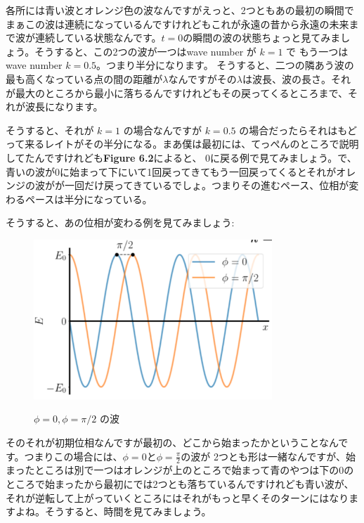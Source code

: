 各所には青い波とオレンジ色の波なんですがえっと、2つともあの最初の瞬間でまぁこの波は連続になっているんですけれどもこれが永遠の昔から永遠の未来まで波が連続している状態なんです。$t=0$の瞬間の波の状態ちょっと見てみましょう。そうすると、この2つの波が一つはwave number が $k = 1$ で
もう一つは wave number $k = 0.5$。つまり半分になります。
そうすると、二つの隣あう波の最も高くなっている点の間の距離が$\lambda$なんですがその$\lambda$は波長、波の長さ。それが最大のところから最小に落ちるんですけれどもその戻ってくるところまで、それが波長になります。

そうすると、それが $k = 1$ の場合なんですが
$k = 0.5$ の場合だったらそれはもどって来るレイトがその半分になる。まあ僕は最初には、てっぺんのところで説明してたんですけれども\textbf{Figure 6.2}によると、 0に戻る例で見てみましょう。で、青いの波が0に始まって下にいて1回戻ってきてもう一回戻ってくるとそれがオレンジの波がが一回だけ戻ってきているでしょ。つまりその進むペース、位相が変わるペースは半分になっている。

そうすると、あの位相が変わる例を見てみましょう:
\begin{figure}[H]
   \centering
    \includegraphics[width=0.8\textwidth]{lesson6/phi.pdf}
    \label{fig: 1}
    \begin{center}
        \caption{$\phi = 0, \phi = \pi / 2$ の波}
    \end{center}
\end{figure}
そのそれが初期位相なんですが最初の、どこから始まったかということなんです。つまりこの場合には、$\phi = 0$と$\phi = \frac{\pi}{2}$の波が
2つとも形は一緒なんですが、始まったところは別で一つはオレンジが上のところで始まって青のやつは下の0のところで始まったから最初にでは2つとも落ちているんですけれども青い波が、それが逆転して上がっていくところにはそれがもっと早くそのターンにはなりますよね。そうすると、時間を見てみましょう。

